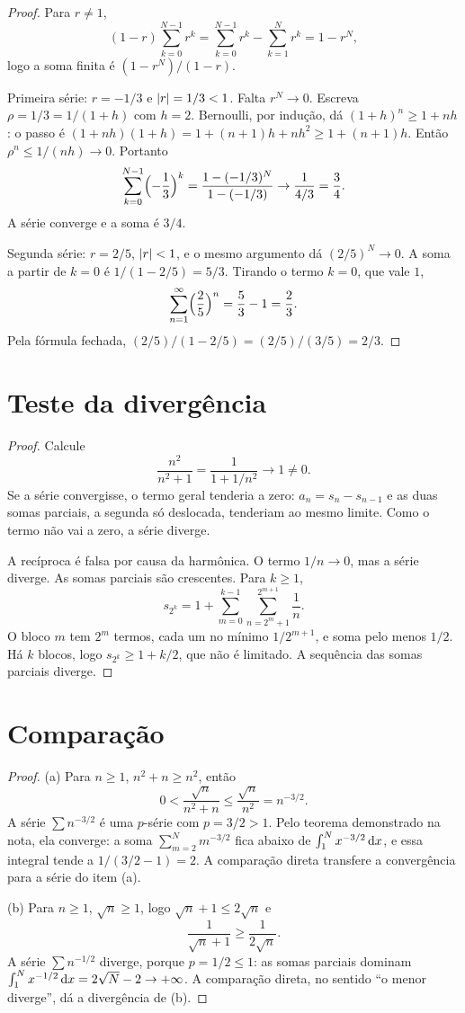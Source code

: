\documentclass[11pt,a4paper]{article}
\begin{document}
\begin{proof}
Para \(r\neq 1\),
\[
(1-r)\sum_{k=0}^{N-1} r^k
=\sum_{k=0}^{N-1} r^k-\sum_{k=1}^{N} r^k
=1-r^N,
\]
logo a soma finita é \((1-r^N)/(1-r)\).

Primeira série: \(r=-1/3\) e \(\left\lvert r \right\rvert=1/3<1\). Falta \(r^N\to 0\). Escreva \(\rho=1/3=1/(1+h)\) com \(h=2\). Bernoulli, por indução, dá \((1+h)^n\ge 1+nh\): o passo é \((1+nh)(1+h)=1+(n+1)h+nh^2\ge 1+(n+1)h\). Então \(\rho^n\le 1/(nh)\to 0\). Portanto
\[
\sum_{k=0}^{N-1}\Bigl(-\frac{1}{3}\Bigr)^k
=\frac{1-(-1/3)^N}{1-(-1/3)}
\to\frac{1}{4/3}=\frac{3}{4}.
\]
A série converge e a soma é \(3/4\).

Segunda série: \(r=2/5\), \(\left\lvert r \right\rvert<1\), e o mesmo argumento dá \((2/5)^N\to 0\). A soma a partir de \(k=0\) é \(1/(1-2/5)=5/3\). Tirando o termo \(k=0\), que vale \(1\),
\[
\sum_{n=1}^\infty\Bigl(\frac{2}{5}\Bigr)^n=\frac{5}{3}-1=\frac{2}{3}.
\]
Pela fórmula fechada, \((2/5)/(1-2/5)=(2/5)/(3/5)=2/3\).
\end{proof}

\section{Teste da divergência}

\begin{proof}
Calcule
\[
\frac{n^2}{n^2+1}=\frac{1}{1+1/n^2}\to 1\neq 0.
\]
Se a série convergisse, o termo geral tenderia a zero: \(a_n=s_n-s_{n-1}\) e as duas somas parciais, a segunda só deslocada, tenderiam ao mesmo limite. Como o termo não vai a zero, a série diverge.

A recíproca é falsa por causa da harmônica. O termo \(1/n\to 0\), mas a série diverge. As somas parciais são crescentes. Para \(k\ge 1\),
\[
s_{2^k}=1+\sum_{m=0}^{k-1}\sum_{n=2^m+1}^{2^{m+1}}\frac{1}{n}.
\]
O bloco \(m\) tem \(2^m\) termos, cada um no mínimo \(1/2^{m+1}\), e soma pelo menos \(1/2\). Há \(k\) blocos, logo \(s_{2^k}\ge 1+k/2\), que não é limitado. A sequência das somas parciais diverge.
\end{proof}

\section{Comparação}

\begin{proof}
(a) Para \(n\ge 1\), \(n^2+n\ge n^2\), então
\[
0<\frac{\sqrt{n}}{n^2+n}\le\frac{\sqrt{n}}{n^2}=n^{-3/2}.
\]
A série \(\sum n^{-3/2}\) é uma \(p\)-série com \(p=3/2>1\). Pelo teorema demonstrado na nota, ela converge: a soma \(\sum_{m=2}^N m^{-3/2}\) fica abaixo de \(\int_1^N x^{-3/2}\,\mathrm{d} x\), e essa integral tende a \(1/(3/2-1)=2\). A comparação direta transfere a convergência para a série do item (a).

(b) Para \(n\ge 1\), \(\sqrt{n}\ge 1\), logo \(\sqrt{n}+1\le 2\sqrt{n}\) e
\[
\frac{1}{\sqrt{n}+1}\ge\frac{1}{2\sqrt{n}}.
\]
A série \(\sum n^{-1/2}\) diverge, porque \(p=1/2\le 1\): as somas parciais dominam \(\int_1^N x^{-1/2}\,\mathrm{d} x=2\sqrt{N}-2\to+\infty\). A comparação direta, no sentido ``o menor diverge'', dá a divergência de (b).
\end{proof}
\end{document}
